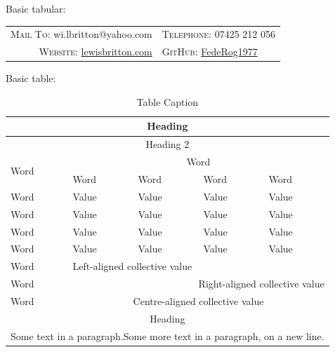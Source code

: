 \documentclass[11pt, english]{article}
\begin{document}
	\newpage

	Basic tabular:

	\begin{center}
                \small
        \begin{tabular}{r|l}
                \textsc{Mail To:} wi.lbritton@yahoo.com & \textsc{Telephone:} 07425 212 056\\
                \textsc{Website:} \href{http://lewisbritton.com}{lewisbritton.com} & \textsc{GitHub:} \href{https://github.com/FedeRog1977}{FedeRog1977}\\
        \end{tabular}
        \end{center}

	Basic table: 

	\begin{table}[h]
		\scriptsize
		\renewcommand{\arraystretch}{1.25}
	\begin{center}
	\begin{tabular}{p{3cm}|p{2cm}p{2cm}p{2cm}p{2cm}}
		\hline
		\hline
		\multicolumn{5}{c}{Heading}\\
		\hline
		\hline
		\multicolumn{5}{c}{Heading 2}\\
		\hline
		\multirow{2}{*}{Word} & \multicolumn{4}{c}{Word}\\
		\cline{2-5}
		& Word & Word & Word & Word\\
		\hline
		Word & Value & Value & Value & Value\\
                Word & Value & Value & Value & Value\\
                Word & Value & Value & Value & Value\\
                Word & Value & Value & Value & Value\\
		\hline
		Word & \multicolumn{4}{l}{Left-aligned collective value}\\
		Word & \multicolumn{4}{r}{Right-aligned collective value}\\
		Word & \multicolumn{4}{c}{Centre-aligned collective value}\\
		\hline
		\hline
		\multicolumn{5}{c}{Heading}\\
		\hline
		\hline
		\multicolumn{5}{p{11.5cm}}{Some text in a paragraph.\newline Some more text in a paragraph, on a new line.}\\
		\hline
	\end{tabular}
		\caption{Table Caption}
	\end{center}
	\end{table}
\end{document}
